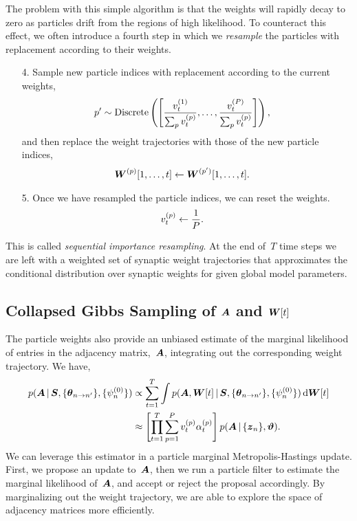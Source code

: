 The problem with this simple algorithm is that the weights will rapidly 
decay to zero as particles drift from the regions of high likelihood. 
To counteract this effect, we often introduce a fourth step in which we 
\emph{resample} the particles with replacement according to their weights. 
\begin{enumerate}
\item[4.] Sample new particle indices with replacement according to the current weights, 
  \begin{align*}
    p' &\sim \mathrm{Discrete} \left(
         \left[ \frac{v_t^{(1)}}{\sum_{p} v_t^{(p)}}, \ldots,
         \frac{v_t^{(P)}}{\sum_{p} v_t^{(p)}} \right] \right),
  \end{align*}
  and then replace the weight trajectories with those of the new particle indices,
  \begin{align*}
    \boldsymbol{W}^{(p)}[1,\ldots,t] &\leftarrow \boldsymbol{W}^{(p')}[1,\ldots,t].
  \end{align*}

\item[5.]   Once we have resampled the particle indices, we can reset the weights.
  \begin{align*}
    v_t^{(p)} &\leftarrow \frac{1}{P}.
  \end{align*}
\end{enumerate}
This is called \emph{sequential importance resampling}. At the end of~$T$
time steps we are left with a weighted set of synaptic weight trajectories
that approximates the conditional distribution over synaptic weights 
for given global model parameters.

\subsection{Collapsed Gibbs Sampling of $\boldsymbol{A}$ and $\boldsymbol{W}[t]$}
The particle weights also provide an unbiased estimate of the marginal
likelihood of entries in the adjacency matrix,~$\boldsymbol{A}$, integrating out
the corresponding weight trajectory. We have,
\begin{align*}
p(\boldsymbol{A} \,|\, \boldsymbol{S}, \{\boldsymbol{\theta}_{n \to n'}\}, \{\psi_n^{(0)}\}) 
&\propto  \sum_{t=1}^{T} \int  p( \boldsymbol{A}, \boldsymbol{W}[t] \,|\, \boldsymbol{S}, \{\boldsymbol{\theta}_{n \to n'}\}, \{\psi_n^{(0)}\}) \, \mathrm{d}\boldsymbol{W}[t] \\
&\approx \left[\prod_{t=1}^T \sum_{p=1}^P v_t^{(p)} \alpha_t^{(p)} \right] p(\boldsymbol{A} \,|\, \{\boldsymbol{z}_n\}, \boldsymbol{\vartheta}).
\end{align*}
We can leverage this estimator in a particle marginal Metropolis-Hastings
\citep{Andrieu-2010} update. First, we propose an update to~$\boldsymbol{A}$, then
we run a particle filter to estimate the marginal likelihood of~$\boldsymbol{A}$, 
and accept or reject the proposal accordingly.
By marginalizing out the weight trajectory, we
are able to explore the space of adjacency matrices more efficiently.

